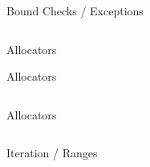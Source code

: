 \documentclass[aspectratio=169,notes]{beamer}
\begin{document}
	\begin{frame}[fragile]{Bound Checks / Exceptions}
		\begin{columns}[T]
		\begin{column}{0.49\textwidth}
		
		\end{column}
		\begin{column}{0.49\textwidth}
		
		\end{column}
		\end{columns}
	\end{frame}

	\begin{frame}[fragile]{Allocators}
		
	\end{frame}

	\begin{frame}[fragile]{Allocators}
		\begin{columns}[T]
		\begin{column}{0.60\textwidth}
		
		\end{column}
		\begin{column}{0.40\textwidth}
		\end{column}
		\end{columns}
	\end{frame}

	\begin{frame}[fragile]{Allocators}
		\begin{columns}[T]
		\begin{column}{0.70\textwidth}
		
		\end{column}
		\begin{column}{0.30\textwidth}
		\end{column}
		\end{columns}
	\end{frame}

	\begin{frame}[fragile]{Iteration / Ranges}
		\begin{columns}[T]
		\begin{column}{0.52\textwidth}
		
		\end{column}
		\begin{column}{0.48\textwidth}
		
		\end{column}
		\end{columns}
	\end{frame}
\end{document}
